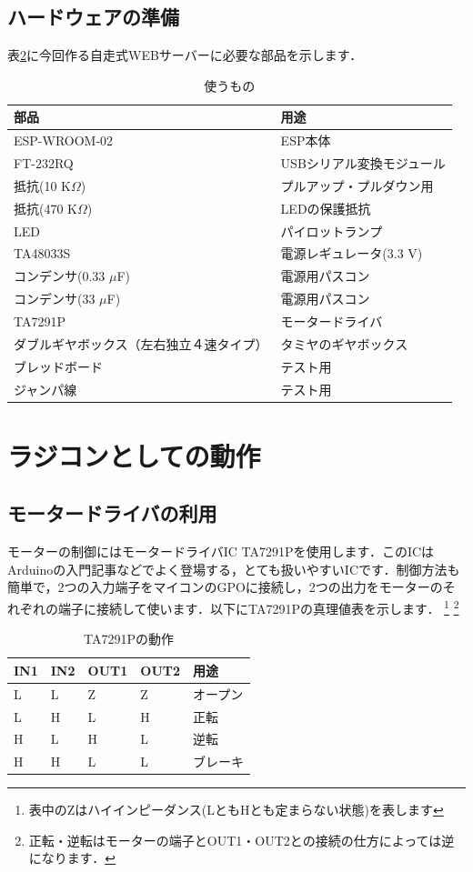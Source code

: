 \subsection{ハードウェアの準備}
表\ref{buhin}に今回作る自走式WEBサーバーに必要な部品を示します．
\begin{table}[htb]
\centering
\caption{使うもの}
\begin{tabular}{|l|l|} \hline
部品 & 用途 \\ \hline \hline
ESP-WROOM-02 & ESP本体  \\ \hline
FT-232RQ & USBシリアル変換モジュール  \\ \hline
抵抗(10 K$\Omega$) & プルアップ・プルダウン用  \\ \hline
抵抗(470 K$\Omega$) & LEDの保護抵抗 \\ \hline
LED & パイロットランプ  \\ \hline
TA48033S & 電源レギュレータ(3.3 V) \\ \hline
コンデンサ(0.33 $\mu$F) & 電源用パスコン  \\ \hline
コンデンサ(33 $\mu$F) & 電源用パスコン  \\ \hline
TA7291P & モータードライバ \\ \hline
ダブルギヤボックス（左右独立４速タイプ） & タミヤのギヤボックス  \\ \hline
ブレッドボード & テスト用 \\ \hline
ジャンパ線 & テスト用 \\ \hline
\end{tabular}
\label{buhin}
\end{table}

\section{ラジコンとしての動作}
\subsection{モータードライバの利用}
    モーターの制御にはモータードライバIC TA7291Pを使用します．このICはArduinoの入門記事などでよく登場する，とても扱いやすいICです．制御方法も簡単で，2つの入力端子をマイコンのGPOに接続し，2つの出力をモーターのそれぞれの端子に接続して使います．以下にTA7291Pの真理値表を示します．
\footnote{表中のZはハイインピーダンス(LともHとも定まらない状態)を表します}
\footnote{正転・逆転はモーターの端子とOUT1・OUT2との接続の仕方によっては逆になります．}

\begin{table}[H]
\centering
\caption{TA7291Pの動作}
\begin{tabular}{|l|l|l|l|l|} \hline
IN1 & IN2 & OUT1 & OUT2 & 用途 \\ \hline \hline
L & L & Z & Z & オープン \\ \hline
L & H & L & H & 正転 \\ \hline
H & L & H & L & 逆転 \\ \hline
H & H & L & L & ブレーキ \\ \hline
\end{tabular}
\label{buhin}
\end{table}

